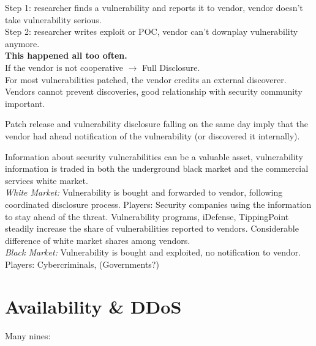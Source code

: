  Step 1: researcher finds a vulnerability and reports it to vendor, vendor doesn't take vulnerability serious.\\
Step 2: researcher writes exploit or POC, vendor can't downplay vulnerability anymore.\\
\textbf{This happened all too often.}\\
If the vendor is not cooperative $\to$ Full Disclosure. \\
For most vulnerabilities patched, the vendor credits an external discoverer. Vendors cannot prevent discoveries, good relationship with security community important.

 Patch release and vulnerability disclosure falling on the
same day imply that the vendor had ahead notification of the vulnerability (or discovered it internally).

 Information about security vulnerabilities can be a valuable asset, vulnerability information is traded in both the underground black market and the commercial services white market.\\
\emph{White Market:} Vulnerability is bought and forwarded to vendor, following coordinated disclosure process. Players: Security companies using the information to stay ahead of the threat. Vulnerability programs, iDefense, TippingPoint steadily increase the share of vulnerabilities reported to vendors. Considerable difference of white market shares among vendors.\\
\textit{Black Market:} Vulnerability is bought and exploited, no notification to vendor. Players: Cybercriminals, (Governments?)

\section{Availability \& DDoS}


 Many nines:


